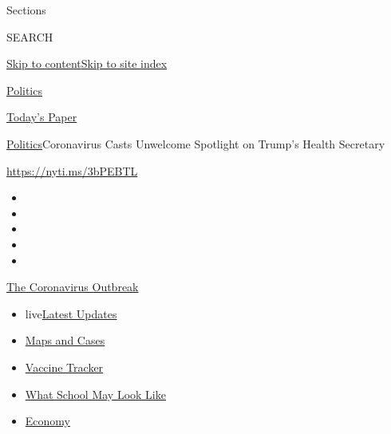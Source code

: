 Sections

SEARCH

\protect\hyperlink{site-content}{Skip to
content}\protect\hyperlink{site-index}{Skip to site index}

\href{https://www.nytimes3xbfgragh.onion/section/politics}{Politics}

\href{https://myaccount.nytimes3xbfgragh.onion/auth/login?response_type=cookie\&client_id=vi}{}

\href{https://www.nytimes3xbfgragh.onion/section/todayspaper}{Today's
Paper}

\href{/section/politics}{Politics}\textbar{}Coronavirus Casts Unwelcome
Spotlight on Trump's Health Secretary

\url{https://nyti.ms/3bPEBTL}

\begin{itemize}
\item
\item
\item
\item
\item
\end{itemize}

\href{https://www.nytimes3xbfgragh.onion/news-event/coronavirus?action=click\&pgtype=Article\&state=default\&region=TOP_BANNER\&context=storylines_menu}{The
Coronavirus Outbreak}

\begin{itemize}
\tightlist
\item
  live\href{https://www.nytimes3xbfgragh.onion/2020/08/02/world/coronavirus-updates.html?action=click\&pgtype=Article\&state=default\&region=TOP_BANNER\&context=storylines_menu}{Latest
  Updates}
\item
  \href{https://www.nytimes3xbfgragh.onion/interactive/2020/us/coronavirus-us-cases.html?action=click\&pgtype=Article\&state=default\&region=TOP_BANNER\&context=storylines_menu}{Maps
  and Cases}
\item
  \href{https://www.nytimes3xbfgragh.onion/interactive/2020/science/coronavirus-vaccine-tracker.html?action=click\&pgtype=Article\&state=default\&region=TOP_BANNER\&context=storylines_menu}{Vaccine
  Tracker}
\item
  \href{https://www.nytimes3xbfgragh.onion/interactive/2020/07/29/us/schools-reopening-coronavirus.html?action=click\&pgtype=Article\&state=default\&region=TOP_BANNER\&context=storylines_menu}{What
  School May Look Like}
\item
  \href{https://www.nytimes3xbfgragh.onion/live/2020/07/31/business/stock-market-today-coronavirus?action=click\&pgtype=Article\&state=default\&region=TOP_BANNER\&context=storylines_menu}{Economy}
\end{itemize}

